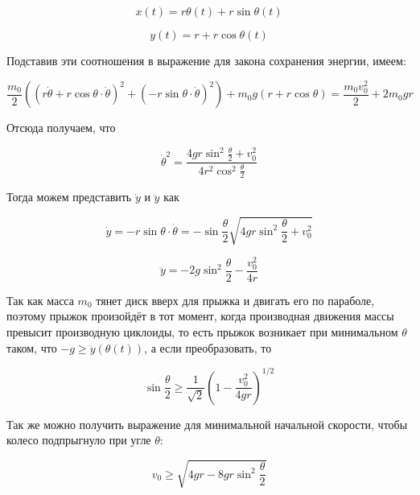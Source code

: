 \documentclass[a4paper,12pt]{article}
\begin{document}
\begin{equation}
    x(t) = r \theta(t) + r \sin{\theta(t)}
\end{equation}


\begin{equation}
    y(t) = r + r \cos{\theta(t)}
\end{equation}

Подставив эти соотношения в выражение для закона сохранения энергии, имеем:

\begin{equation}
    \frac{m_0}{2} \left( \left( r \dot{\theta} + r \cos{\theta} \cdot \dot{\theta} \right)^2  + \left( -r \sin{\theta} \cdot \dot{\theta} \right)^2 \right) + m_0g(r + r \cos{\theta}) = \frac{m_0 v_0^2}{2} + 2m_0gr
\end{equation}

Отсюда получаем, что

\begin{equation}
    \dot{\theta}^2 = \frac{4gr \sin^2{\frac{\theta}{2}} + v_0^2}{4 r^2 \cos^2{\frac{\theta}{2}}}
\end{equation}

Тогда можем представить $\dot{y}$ и $\ddot{y}$ как

\begin{equation}
    \dot{y} = -r \sin{\theta} \cdot \dot{\theta} = - \sin{\frac{\theta}{2}} \sqrt{4gr \sin^2{\frac{\theta}{2}} + v_0^2}
\end{equation}

\begin{equation}
    \ddot{y} = -2g \sin^2{\frac{\theta}{2}} - \frac{v_0^2}{4r}
\end{equation}

Так как масса $m_0$ тянет диск вверх для прыжка и двигать его по параболе, поэтому прыжок произойдёт в тот момент, когда производная движения массы превысит производную циклоиды, то есть прыжок возникает при минимальном $\theta$ таком, что $-g \ge \ddot{y}(\theta(t))$, а если преобразовать, то

\begin{equation}\label{angle-speed}
    \sin{\frac{\theta}{2}} \ge \frac{1}{\sqrt{2}} \left( 1 - \frac{v_0^2}{4gr} \right)^{1/2}
\end{equation}

Так же можно получить выражение для минимальной начальной скорости, чтобы колесо подпрыгнуло при угле $\theta$:

\begin{equation}
    v_0 \ge \sqrt{4gr - 8gr \sin^2{\frac{\theta}{2}}}
\end{equation}
\end{document}
